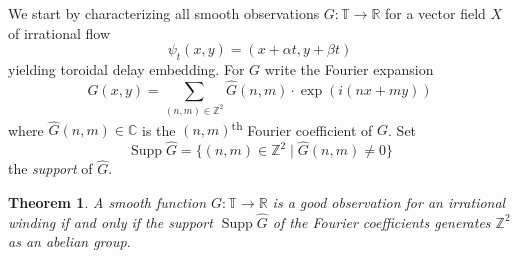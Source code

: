 \documentclass[11pt]{article}
\newtheorem{theorem}{Theorem}[section]
\theoremstyle{definition}
\theoremstyle{remark}
\newcommand{\RR}{\mathbb{R}}
\newcommand{\CC}{\mathbb{C}}
\newcommand{\ZZ}{\mathbb{Z}}
\newcommand{\TT}{\mathbb{T}}
\newcommand{\ts}{\textsuperscript}
\DeclareMathOperator{\Supp}{Supp}
\begin{document}
    We start by characterizing all smooth observations $G:\TT \rightarrow \RR$ for a vector field $X$ of irrational flow
    \[\psi_t(x,y) = (x+\alpha t, y+\beta t)\]
    yielding toroidal delay embedding. For $G$ write the Fourier expansion
    \[G(x,y) = \sum_{(n,m)\in \ZZ^2} \hat{G}(n,m)\cdot \exp(i(nx+my))\]
    where $\hat{G}(n,m)\in\CC$ is the $(n,m)$\ts{th} Fourier coefficient of $G$. Set
    \[\Supp\hat{G} = \{ (n,m) \in \ZZ^2 \mid \hat{G}(n,m) \neq 0 \}\]
    the \textit{support} of $\hat{G}$.
    \begin{theorem}\label{thm:fourier}
    A smooth function $G:\TT \rightarrow \RR$ is a good observation for an irrational winding if and only if the support $\Supp\hat{G}$ of the Fourier coefficients generates $\ZZ^2$ as an abelian group.
    \end{theorem}
\end{document}
